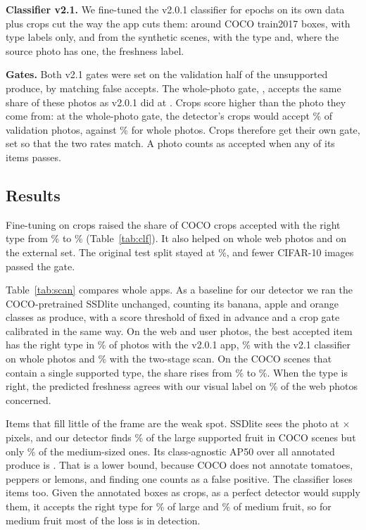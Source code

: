 \textbf{Classifier v2.1.} We fine-tuned the v2.0.1 classifier for
\VtwoEpochs{} epochs on its own data plus \ClfNCrops{} crops cut the way the
app cuts them: \ClfNCoco{} around COCO train2017 boxes, with type labels only,
and \ClfNSynth{} from the synthetic scenes, with the type and, where the source
photo has one, the freshness label.

\textbf{Gates.} Both v2.1 gates were set on the validation half of the
unsupported produce, by matching false accepts. The whole-photo gate,
\GateVtwo, accepts the same share of these photos as v2.0.1 did at \GateVone.
Crops score higher than the photo they come from: at the whole-photo gate, the
detector's crops would accept \CalCropsAtWhole\% of \CalN{} validation photos,
against \CalWhole\% for whole photos. Crops therefore get their own gate, set
so that the two rates match. A photo counts as accepted when any of its items
passes.

\subsection{Results}
Fine-tuning on crops raised the share of COCO crops accepted with the right
type from \VoneCocoCrops\% to \VtwoCocoCrops\% (Table~\ref{tab:clf}). It also
helped on whole web photos and on the external set. The original test split
stayed at \VtwoMain\%, and fewer CIFAR-10 images passed the gate.

Table~\ref{tab:scan} compares whole apps. As a baseline for our detector we ran
the COCO-pretrained SSDlite unchanged, counting its banana, apple and orange
classes as produce, with a score threshold of \ProtoThr{} fixed in advance and
a crop gate calibrated in the same way. On the \ScanWebN{} web and user photos,
the best accepted item has the right type in \ScanWebVone\% of photos with the
v2.0.1 app, \ScanWebWhole\% with the v2.1 classifier on whole photos and
\ScanWebDet\% with the two-stage scan. On the \ScanSingleN{} COCO scenes that
contain a single supported type, the share rises from \ScanSingleVone\% to
\ScanSingleDet\%. When the type is right, the predicted freshness agrees with
our visual label on \ScanFreshDet\% of the \ScanFreshDetN{} web photos
concerned.

Items that fill little of the frame are the weak spot. SSDlite sees the photo
at \DetInput{}$\times$\DetInput{} pixels, and our detector finds
\ScanLargeFound\% of the large supported fruit in COCO scenes but only
\ScanMedFound\% of the medium-sized ones. Its class-agnostic AP50 over all annotated
produce is \ScanAp{}. That is a lower bound, because COCO does not annotate
tomatoes, peppers or lemons, and finding one counts as a false positive. The classifier loses
items too. Given the annotated boxes as crops, as a perfect detector would
supply them, it accepts the right type for \OracleLarge\% of large and
\OracleMed\% of medium fruit, so for medium fruit most of the loss is in
detection.

